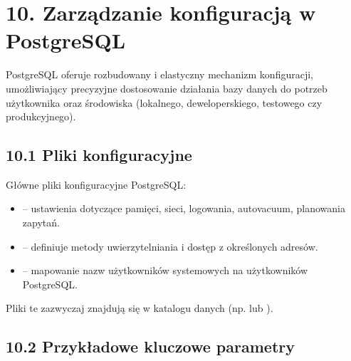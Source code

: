 \documentclass[a4paper,11pt,polish]{sphinxmanual}
\begin{document}
\section{10. Zarządzanie konfiguracją w PostgreSQL}
\label{\detokenize{Konfiguracja_baz_danych/Konfiguracja_baz_danych:zarzadzanie-konfiguracja-w-postgresql}}
\sphinxAtStartPar
PostgreSQL oferuje rozbudowany i elastyczny mechanizm konfiguracji, umożliwiający precyzyjne dostosowanie działania bazy danych do potrzeb użytkownika oraz środowiska (lokalnego, deweloperskiego, testowego czy produkcyjnego).


\subsection{10.1 Pliki konfiguracyjne}
\label{\detokenize{Konfiguracja_baz_danych/Konfiguracja_baz_danych:pliki-konfiguracyjne}}
\sphinxAtStartPar
Główne pliki konfiguracyjne PostgreSQL:
\begin{itemize}
\item {} 
\sphinxAtStartPar
{} – ustawienia dotyczące pamięci, sieci, logowania, autovacuum, planowania zapytań.

\item {} 
\sphinxAtStartPar
{} – definiuje metody uwierzytelniania i dostęp z określonych adresów.

\item {} 
\sphinxAtStartPar
{} – mapowanie nazw użytkowników systemowych na użytkowników PostgreSQL.

\end{itemize}

\sphinxAtStartPar
Pliki te zazwyczaj znajdują się w katalogu danych (np.  lub ).


\subsection{10.2 Przykładowe kluczowe parametry }
\label{\detokenize{Konfiguracja_baz_danych/Konfiguracja_baz_danych:przykladowe-kluczowe-parametry-postgresql-conf}}
\end{document}

